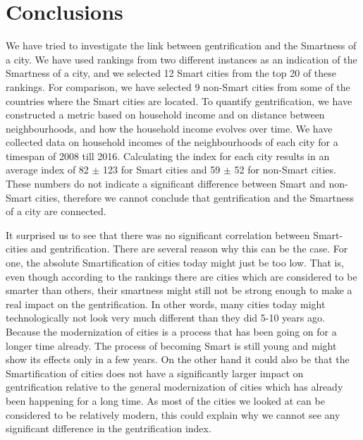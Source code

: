 \documentclass[a4paper, 10pt]{IEEEconf}      %
\begin{document}
\section{Conclusions}
\label{sec:conclusion}
We have tried to investigate the link between gentrification and the Smartness of a city. We have used rankings from two different instances as an indication of the Smartness of a city, and we selected 12 Smart cities from the top 20 of these rankings. For comparison, we have selected 9 non-Smart cities from some of the countries where the Smart cities are located. To quantify gentrification, we have constructed a metric based on household income and on distance between neighbourhoods, and how the household income evolves over time. We have collected data on household incomes of the neighbourhoods of each city for a timespan of 2008 till 2016. Calculating the index for each city results in an average index of 82 $\pm$ 123 for Smart cities and 59 $\pm$ 52 for non-Smart cities. These numbers do not indicate a significant difference between Smart and non-Smart cities, therefore we cannot conclude that gentrification and the Smartness of a city are connected.

It surprised us to see that there was no significant correlation between Smart-cities and gentrification. There are several reason why this can be the case. For one, the absolute Smartification of cities today might just be too low. That is, even though according to the rankings there are cities which are considered to be smarter than others, their smartness might still not be strong enough to make a real impact on the gentrification. In other words, many cities today might technologically not look very much different than they did 5-10 years ago. Because the modernization of cities is a process that has been going on for a longer time already. The process of becoming Smart is still young and might show its effects only in a few years. 
On the other hand it could also be that the Smartification of cities does not have a significantly larger impact on gentrification relative to the general modernization of cities which has already been happening for a long time. As most of the cities we looked at can be considered to be relatively modern, this could explain why we cannot see any significant difference in the gentrification index. 
\end{document}
